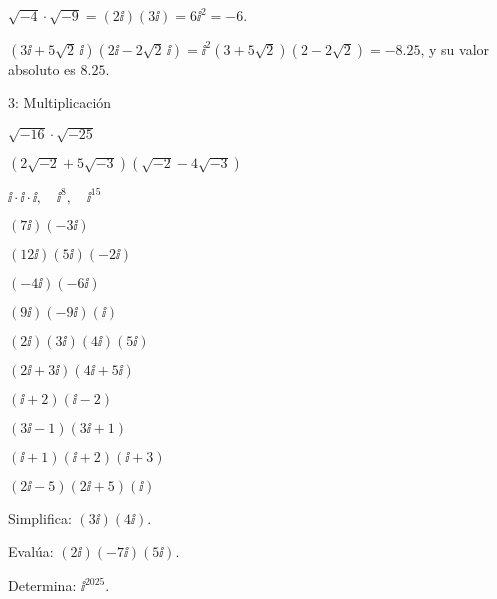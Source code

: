 
\begin{ejemplos}
  \item \(\sqrt{-4}\cdot\sqrt{-9} = (2\ii)(3\ii) = 6\ii^2 = -6\).
  \item \((3\ii+5\sqrt{2}\,\ii)(2\ii-2\sqrt{2}\,\ii) =
        \ii^2(3+5\sqrt{2})(2-2\sqrt{2}) = -8.25\),
        y su valor absoluto es \(8.25\).
\end{ejemplos}

\begin{actividad}{3: Multiplicación}
  \item \(\sqrt{-16}\cdot\sqrt{-25}\)
  \item \((2\sqrt{-2}+5\sqrt{-3})(\sqrt{-2}-4\sqrt{-3})\)
  \item \(\ii\cdot \ii \cdot \ii,\quad \ii^8,\quad \ii^{15}\)

  \item \((7\ii)(-3\ii)\)
  \item \((12\ii)(5\ii)(-2\ii)\)
  \item \((-4\ii)(-6\ii)\)
  \item \((9\ii)(-9\ii)(\ii)\)
  \item \((2\ii)(3\ii)(4\ii)(5\ii)\)

  \item \((2\ii+3\ii)(4\ii+5\ii)\)
  \item \((\ii+2)(\ii-2)\)
  \item \((3\ii-1)(3\ii+1)\)
  \item \((\ii+1)(\ii+2)(\ii+3)\)
  \item \((2\ii-5)(2\ii+5)(\ii)\)
\end{actividad}

\begin{retos}
  \item Simplifica: \((3\ii)(4\ii)\).
  \item Evalúa: \((2\ii)(-7\ii)(5\ii)\).
  \item Determina: \(\ii^{2025}\).
\end{retos}